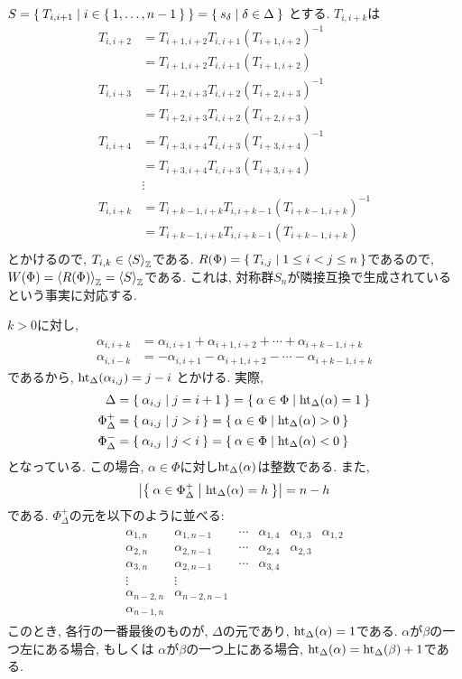 $S=\Set{T_{i,i+1}|i\in\Set{1,\ldots,n-1}}=\Set{s_\delta|\delta\in\Delta}$
とする.
$T_{i,i+k}$は
\begin{align*}
  T_{i,i+2}
  &=T_{i+1,i+2}T_{i,i+1}(T_{i+1,i+2})^{-1}\\
  &=T_{i+1,i+2}T_{i,i+1}(T_{i+1,i+2})\\
  T_{i,i+3}
  &=T_{i+2,i+3}T_{i,i+2}(T_{i+2,i+3})^{-1}\\
  &=T_{i+2,i+3}T_{i,i+2}(T_{i+2,i+3})\\
  T_{i,i+4}
  &=T_{i+3,i+4}T_{i,i+3}(T_{i+3,i+4})^{-1}\\
  &=T_{i+3,i+4}T_{i,i+3}(T_{i+3,i+4})\\
  &\vdots\\
  T_{i,i+k}
  &=T_{i+k-1,i+k}T_{i,i+k-1}(T_{i+k-1,i+k})^{-1}\\
  &=T_{i+k-1,i+k}T_{i,i+k-1}(T_{i+k-1,i+k})\\
\end{align*}
とかけるので, 
$T_{i,k}\in\Braket{S}_{\mathbb{Z}}$である.
$R(\Phi)=\Set{T_{i,j}|1\leq i<j\leq n}$であるので,
$W(\Phi)=\Braket{R(\Phi)}_{\mathbb{Z}}=\Braket{S}_{\mathbb{Z}}$である.
これは, 対称群$S_n$が隣接互換で生成されているという事実に対応する.

$k>0$に対し,
\begin{align*}
\alpha_{i,i+k}&=\alpha_{i,i+1}+\alpha_{i+1,i+2}+\cdots+\alpha_{i+k-1,i+k}\\
\alpha_{i,i-k}&=-\alpha_{i,i+1}-\alpha_{i+1,i+2}-\cdots-\alpha_{i+k-1,i+k}
\end{align*}
であるから,
$\operatorname{ht}_\Delta(\alpha_{i,j})=j-i$
とかける.
実際,
\begin{align*}
\Delta&=\Set{\alpha_{i,j}|j=i+1}=\Set{\alpha\in\Phi|\operatorname{ht}_\Delta(\alpha)=1}\\
\Phi_\Delta^+&=\Set{\alpha_{i,j}|j>i}=\Set{\alpha\in\Phi|\operatorname{ht}_\Delta(\alpha)>0}\\
\Phi_\Delta^-&=\Set{\alpha_{i,j}|j<i}=\Set{\alpha\in\Phi|\operatorname{ht}_\Delta(\alpha)<0}
\end{align*}
となっている.
この場合, $\alpha\in\Phi$に対し$\operatorname{ht}_\Delta(\alpha)$は整数である.
また,
\begin{align*}
  \left|\Set{\alpha\in\Phi_\Delta^+ | \operatorname{ht}_\Delta(\alpha)=h}\right|
  =n-h
\end{align*}
である.
$\Phi_\Delta^+$の元を以下のように並べる:
\begin{align*}
  \begin{array}{cccccc}
    \alpha_{1,n}&\alpha_{1,n-1}&\cdots&\alpha_{1,4}&\alpha_{1,3}&\alpha_{1,2}\\
    \alpha_{2,n}&\alpha_{2,n-1}&\cdots&\alpha_{2,4}&\alpha_{2,3}\\
    \alpha_{3,n}&\alpha_{2,n-1}&\cdots&\alpha_{3,4}\\
    \vdots      &\vdots&&\\
    \alpha_{n-2,n}&\alpha_{n-2,n-1}\\
    \alpha_{n-1,n}
  \end{array}
\end{align*}
このとき, 各行の一番最後のものが, $\Delta$の元であり,
$\operatorname{ht}_\Delta(\alpha)=1$である.
$\alpha$が$\beta$の一つ左にある場合,
もしくは
$\alpha$が$\beta$の一つ上にある場合,
$\operatorname{ht}_\Delta(\alpha)=\operatorname{ht}_\Delta(\beta)+1$である.


